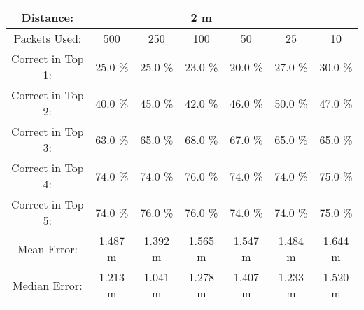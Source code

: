 \begin{tabular}{| c || c | c | c | c | c | c |}
\hline
Distance: &  &  & 2 m &  &  & \\
\hline
Packets Used: & 500 & 250 & 100 & 50 & 25 & 10 \\
\hline
\hline
Correct in Top 1: & 25.0 \% & 25.0 \% & 23.0 \% & 20.0 \% & 27.0 \% & 30.0 \% \\
\hline
Correct in Top 2: & 40.0 \% & 45.0 \% & 42.0 \% & 46.0 \% & 50.0 \% & 47.0 \% \\
\hline
Correct in Top 3: & 63.0 \% & 65.0 \% & 68.0 \% & 67.0 \% & 65.0 \% & 65.0 \% \\
\hline
Correct in Top 4: & 74.0 \% & 74.0 \% & 76.0 \% & 74.0 \% & 74.0 \% & 75.0 \% \\
\hline
Correct in Top 5: & 74.0 \% & 76.0 \% & 76.0 \% & 74.0 \% & 74.0 \% & 75.0 \% \\
\hline
\hline
Mean Error: & 1.487 m & 1.392 m & 1.565 m & 1.547 m & 1.484 m & 1.644 m \\
\hline
Median Error: & 1.213 m & 1.041 m & 1.278 m & 1.407 m & 1.233 m & 1.520 m \\
\hline
\end{tabular}